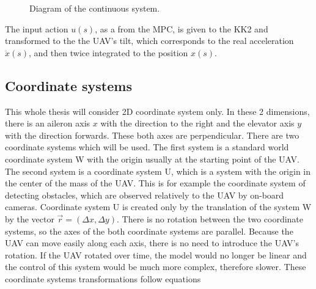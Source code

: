 \documentclass[a4paper,11pt,titlepage]{article}
\begin{document}
\begin{figure}[h]
\centering
{}
\caption{Diagram of the continuous system.}
\label{fig:LTI}
\end{figure}

The input action $u(s)$, as a from the MPC, is given to the KK2 and transformed to the the UAV's tilt, which corresponds to the real acceleration $\ddot{x}(s)$, and then twice integrated to the position ${x}(s)$.

\subsection{Coordinate systems}
\label{ssec:coordinate_system}
This whole thesis will consider 2D coordinate system only. In these 2 dimensions, there is an aileron axis $x$ with the direction to the right and the elevator axis $y$ with the direction forwards. These both axes are perpendicular. There are two coordinate systems which will be used. The first system is a standard world coordinate system W with the origin usually at the starting point of the UAV. The second system is a coordinate system U, which is a system with the origin in the center of the mass of the UAV. This is for example the coordinate system of detecting obstacles, which are observed relatively to the UAV by on-board cameras. Coordinate system U is created only by the translation of the system W by the vector $\vec{r} = (\Delta x, \Delta y)$. There is no rotation between the two coordinate systems, so the axes of the both coordinate systems are parallel. Because the UAV can move easily along each axis, there is no need to introduce the UAV's rotation. If the UAV rotated over time, the model would no longer be linear and the control of this system would be much more complex, therefore slower. These coordinate systems transformations follow equations
\end{document}
